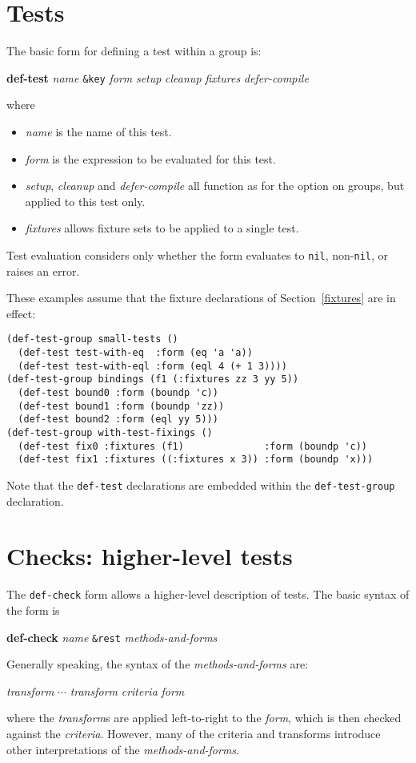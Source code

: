 \documentclass{article}
\begin{document}
\section{Tests}
\label{tests}
The basic form for defining a
test within a group is:
\begin{center}
\textbf{def-test} \textit{name}
 \texttt{\&key} \textit{form} \textit{setup} \textit{cleanup} \textit{fixtures} \textit{defer-compile}
\end{center}
where
\begin{itemize}
\item\textit{name} is the name of this test.
\item\textit{form} is the expression to be evaluated for this test.
\item\textit{setup},
  \textit{cleanup} and
  \textit{defer-compile} all function as for the option on groups, but
  applied to this test only.
\item\textit{fixtures} allows
  fixture sets to be applied to a single test.
\end{itemize}
Test evaluation considers only whether the form evaluates to
\texttt{nil}, non-\texttt{nil}, or raises an error.

These examples assume that the fixture declarations of
Section~\ref{fixtures} are in effect:
\begin{verbatim}
(def-test-group small-tests ()
  (def-test test-with-eq  :form (eq 'a 'a))
  (def-test test-with-eql :form (eql 4 (+ 1 3))))
(def-test-group bindings (f1 (:fixtures zz 3 yy 5))
  (def-test bound0 :form (boundp 'c))
  (def-test bound1 :form (boundp 'zz))
  (def-test bound2 :form (eql yy 5)))
(def-test-group with-test-fixings ()
  (def-test fix0 :fixtures (f1)              :form (boundp 'c))
  (def-test fix1 :fixtures ((:fixtures x 3)) :form (boundp 'x)))
\end{verbatim}
Note that the \texttt{def-test} declarations are embedded within the
\texttt{def-test-group} declaration.

\section{Checks: higher-level tests}
The
\texttt{def-check}
form allows a higher-level description of tests.  The basic syntax of
the form is
\begin{center}
\textbf{def-check} \textit{name} \texttt{\&rest} \textit{methods-and-forms}
\end{center}
Generally speaking, the syntax of the \textit{methods-and-forms} are:
\begin{center}
\textit{transform} $\cdots$ \textit{transform} \textit{criteria} \textit{form}
\end{center}
where the \emph{transform}s are applied left-to-right to the
\emph{form}, which is then checked against the \emph{criteria}.
However, many of the criteria and transforms introduce other
interpretations of the \textit{methods-and-forms}.
\end{document}
